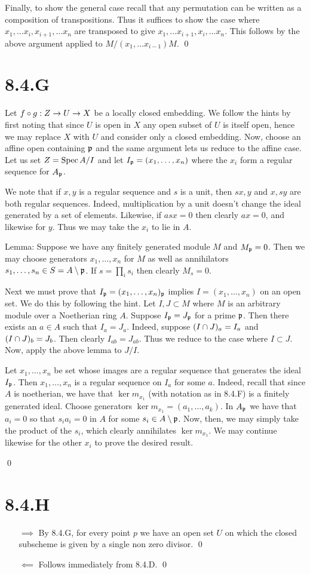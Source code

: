 \documentclass{article}
\begin{document}
Finally, to show the general case recall that any permutation can be written as
a composition of transpositions. Thus it suffices to show the case where
$x_1, \dots x_i, x_{i+1}, \dots x_n$ are transposed to give $x_1, \dots x_{i+1}, x_{i},
    \dots x_n$. This
follows by the above argument applied to $M/(x_1, \dots x_{i-1})M$. \qed

\section{8.4.G}
Let $f \circ g: Z \to U \to X$ be a locally closed embedding. We follow the hints
by first noting that since $U$ is open in
$X$ any open subset of $U$ is itself
open, hence we may replace $X$ with $U$
and consider only a closed embedding. Now, choose an affine open containing
$\mathfrak{p}$ and the same argument lets us reduce to the affine
case. Let us set $Z=\operatorname{Spec} A/I$ and let $I_{\mathfrak{p}}=(x_1, \dots, x_n)$ where
the $x_i$ form a regular sequence for
$A_{\mathfrak{p}}$.

We note that if $x, y$ is a regular sequence and
$s$ is a unit, then $sx, y$ and
$x, sy$ are both regular sequences. Indeed, multiplication by a
unit doesn't change the ideal generated by a set of elements. Likewise, if
$asx=0$ then clearly $ax=0$, and likewise for
$y$. Thus we may take the $x_i$ to lie in
$A$.

Lemma: Suppose we have any finitely generated module $M$
and $M_{\mathfrak{p}}=0$. Then we may choose generators
$x_1, \dots, x_n$ for $M$ as well as annihilators
$s_1, \dots, s_n \in S = A \setminus \mathfrak{p}$. If $s=\prod_i s_i$ then clearly
$M_s=0$.

Next we must prove that $I_{\mathfrak{p}}=(x_1, \dots,
    x_n)_{\mathfrak{p}}$ implies $I=(x_1, \dots, x_n)$
on an open set. We do this by following the hint. Let $I, J \subset M$
where $M$ is an arbitrary module over a Noetherian ring
$A$. Suppose $I_{\mathfrak{p}}=J_{\mathfrak{p}}$ for a prime
$\mathfrak{p}$. Then there exists an $a \in A$ such that
$I_a=J_a$. Indeed, suppose $(I \cap J)_a=I_a$ and
$(I \cap J)_b=J_b$. Then clearly $I_{ab}=J_{ab}$. Thus we reduce
to the case where $I \subset J$. Now, apply the above lemma to
$J/I$.

Let $x_1, \dots, x_n$ be set whose images are a regular sequence that
generates the ideal $I_{\mathfrak{p}}$. Then $x_1, \dots, x_n$ is a
regular sequence on $I_a$ for some $a$.
Indeed, recall that since $A$ is noetherian, we have that
$\ker m_{x_1}$ (with notation as in 8.4.F) is a finitely generated
ideal. Choose generators $\ker m_{x_1}=(a_1, \dots, a_k)$. In $A_{\mathfrak{p}}$ we
have that $a_i=0$ so that $s_ia_i=0$ in
$A$ for some $s_i \in A \setminus \mathfrak{p}$. Now, then, we may
simply take the product of the $s_i$, which clearly
annihilates $\ker m_{x_1}$. We may continue likewise for the other
$x_i$ to prove the desired result.

\qed

\section{8.4.H}
\begin{itemize}
    \item[$\implies$] By 8.4.G, for every point $p$ we
          have an open set $U$ on which the closed subscheme is given
          by a single non zero divisor. \qed
    \item[$\impliedby$] Follows immediately from 8.4.D. \qed
\end{itemize}
\end{document}
